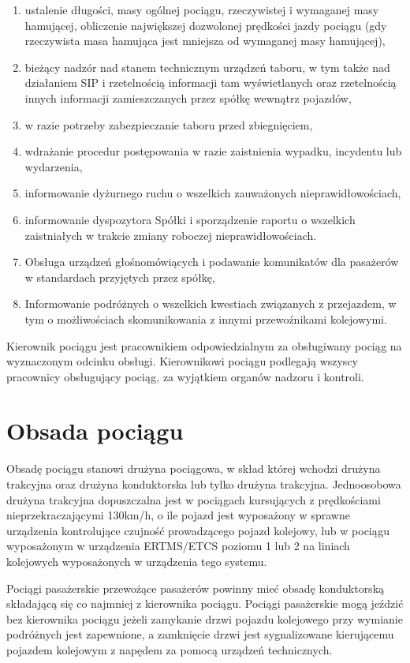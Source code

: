 \begin{enumerate}
	\item ustalenie długości, masy ogólnej pociągu, rzeczywistej i wymaganej masy hamującej, obliczenie największej dozwolonej prędkości jazdy pociągu (gdy rzeczywista masa hamująca jest mniejsza od wymaganej masy hamującej),
	\item bieżący nadzór nad stanem technicznym urządzeń taboru, w tym także nad działaniem SIP i rzetelnością informacji tam wyświetlanych oraz rzetelnością innych informacji zamieszczanych przez spółkę wewnątrz pojazdów,
	\item w razie potrzeby zabezpieczanie taboru przed zbiegnięciem,
	\item wdrażanie procedur postępowania w razie zaistnienia wypadku, incydentu lub wydarzenia,
	\item informowanie dyżurnego ruchu o wszelkich zauważonych nieprawidłowościach,
	\item informowanie dyspozytora Spółki i sporządzenie raportu o wszelkich zaistniałych w trakcie zmiany roboczej nieprawidłowościach.
	\item Obsługa urządzeń głośnomówiących i podawanie komunikatów dla pasażerów w standardach przyjętych przez spółkę,
	\item Informowanie podróżnych o wszelkich kwestiach związanych z przejazdem, w tym o możliwościach skomunikowania z innymi przewoźnikami kolejowymi.
\end{enumerate}
Kierownik pociągu jest pracownikiem odpowiedzialnym za obsługiwany pociąg na wyznaczonym odcinku obsługi. Kierownikowi pociągu podlegają wszyscy
pracownicy obsługujący pociąg, za wyjątkiem organów nadzoru i kontroli.

\section{Obsada pociągu}
\label{sec:obsada}
Obsadę pociągu stanowi drużyna pociągowa, w skład której wchodzi drużyna trakcyjna oraz drużyna konduktorska lub tylko drużyna trakcyjna. Jednoosobowa drużyna trakcyjna dopuszczalna jest w pociągach kursujących z prędkościami nieprzekraczającymi 130km/h, o ile pojazd jest wyposażony w sprawne urządzenia kontrolujące czujność prowadzącego
pojazd kolejowy, lub w pociągu wyposażonym w urządzenia ERTMS/ETCS poziomu 1 lub 2 na liniach kolejowych wyposażonych w urządzenia tego systemu.

Pociągi pasażerskie przewożące pasażerów powinny mieć obsadę konduktorską składającą się co najmniej z kierownika pociągu. Pociągi pasażerskie mogą jeździć bez kierownika pociągu jeżeli zamykanie drzwi pojazdu kolejowego przy wymianie podróżnych jest zapewnione, a zamknięcie drzwi jest sygnalizowane kierującemu pojazdem kolejowym z napędem za pomocą urządzeń technicznych. 

